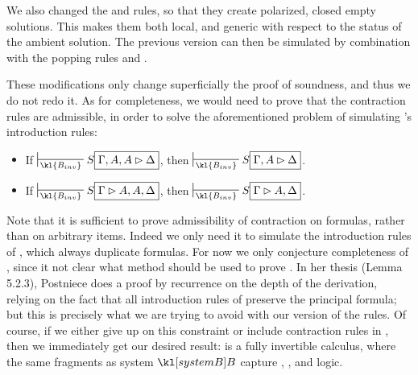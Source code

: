 \begin{remark}
  We also changed the \rsf{\bot{-}} and \rsf{\top{+}} rules, so that they create
  polarized, closed empty solutions. This makes them both local, and generic
  with respect to the status of the ambient solution. The previous version can
  then be simulated by combination with the popping rules  and
  .
\end{remark}

These modifications only change superficially the proof of soundness, and thus
we do not redo it. As for completeness, we would need to prove that the
contraction rules are admissible, in order to solve the aforementioned problem
of simulating 's introduction rules:

\begin{lemma}
  \sbr
  \begin{itemize}
    \item If $\prov{\kl{B_{inv}}} S\select{\Gamma, A, A \J \Delta}$, then
          $\prov{\kl{B_{inv}}} S\select{\Gamma, A \J \Delta}$.
    \item If $\prov{\kl{B_{inv}}} S\select{\Gamma \J A, A, \Delta}$, then
          $\prov{\kl{B_{inv}}} S\select{\Gamma \J A, \Delta}$.
  \end{itemize}
\end{lemma}

Note that it is sufficient to prove admissibility of contraction on formulas,
rather than on arbitrary items. Indeed we only need it to simulate the
introduction rules of , which always duplicate formulas. For now we
only conjecture completeness of , since it not clear what method
should be used to prove . In her thesis
\cite{postniece_proof_2010} (Lemma 5.2.3), Postniece does a proof by recurrence
on the depth of the derivation, relying on the fact that all introduction rules
of  preserve the principal formula; but this is precisely what we
are trying to avoid with our version of the rules. Of course, if we either give
up on this constraint or include contraction rules in , then we
immediately get our desired result:  is a fully invertible
calculus, where the same fragments as system $\sysB$ capture ,
,  and  logic.

